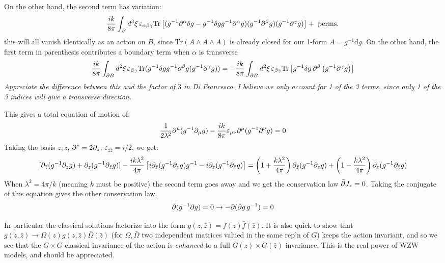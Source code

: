 \documentclass[11pt]{article}
\begin{document}
\begin{enumerate}
	On the other hand, the second term has variation:
	\[
		\frac{i k}{8 \pi} \int_B d^3 \xi \, \varepsilon_{\alpha \beta \gamma} \mathrm{Tr}\left[(g^{-1} \partial^\alpha \delta g - g^{-1} \delta g g^{-1} \partial^\alpha g) (g^{-1} \partial^\beta g) (g^{-1} \partial^\gamma g) \right] + \text{ perms.}
	\]
	this will all vanish identically as an action on $B$, since $\mathrm{Tr}(A \wedge A \wedge A)$ is already closed for our 1-form $A = g^{-1} \mathrm{d} g$. On the other hand, the first term in parenthesis contributes a boundary term when $\alpha$ is transverse 
	\[
		\frac{i k}{8\pi} \int_{\partial B} d^2 \xi\, \varepsilon_{\beta \gamma} \mathrm{Tr}(g^{-1} \delta g g^{-1} \partial^\beta g (g^{-1} \partial^\gamma g))
		 = -\frac{i k}{8\pi} \int_{\partial B} d^2 \xi\, \varepsilon_{\beta \gamma} \mathrm{Tr}\left[g^{-1} \delta g \, \partial^\beta \left( g^{-1}  \partial^\gamma g \right) \right]
	\]
		\emph{Appreciate the difference between this and the factor of $3$ in Di Francesco. I believe we only account for 1 of the 3 terms, since only 1 of the 3 indices will give a transverse direction.}
		
	This gives a total equation of motion of:
	\begin{equation}
		\frac{1}{2\lambda^2} \partial^\mu(g^{-1} \partial_\mu g) - \frac{i k}{8 \pi} \varepsilon_{\mu \nu} \partial^\mu(g^{-1} \partial^\nu g) = 0
	\end{equation}
	Taking the basis $z, \bar z$, $\partial^z = 2 \partial_{\bar z}$, $\varepsilon_{z \bar z} = i/2$, we get:
	\[
		[\partial_{\bar z} (g^{-1} \partial_z g) + \partial_{z} (g^{-1} \partial_{\bar z} g)] - \frac{i k \lambda^2}{4 \pi} \left[i \partial_{\bar z} (g^{-1} \partial_z g) g^{-1} - i \partial_z (g^{-1} \partial_{\bar z} g) \right] = \left(1 + \frac{k \lambda^2}{4\pi}\right) \partial_{\bar z} (g^{-1} \partial_z g) + \left(1 - \frac{k \lambda^2}{4\pi} \right) \partial_{z} (g^{-1} \partial_{\bar z} g)
	\]
	When $\lambda^2 = 4\pi/k$ (meaning $k$ must be positive) the second term goes away and we get the conservation law $\bar {\partial} J_z = 0$. Taking the conjugate of this equation gives the other conservation law. 
	\[
		\bar {\partial} (g^{-1} \partial g) = 0 \to - \partial(\bar {\partial} g \, g^{-1}) = 0
	\]
	
	In particular the classical solutions factorize into the form $g(z, \bar z) = f(z) \bar f(\bar z)$. It is also quick to show that $g(z, \bar z) \to \Omega(z) g(z, \bar z) \bar \Omega (\bar z)$ (for $\Omega, \bar \Omega$ two independent matrices valued in the same rep'n of $G$) keeps the action invariant, and so we see that the $G \times G$ classical invariance of the action is \emph{enhanced} to a full $G(z) \times G(\bar z)$ invariance. This is the real power of WZW models, and should be appreciated.
	

\end{enumerate}
\end{document}
